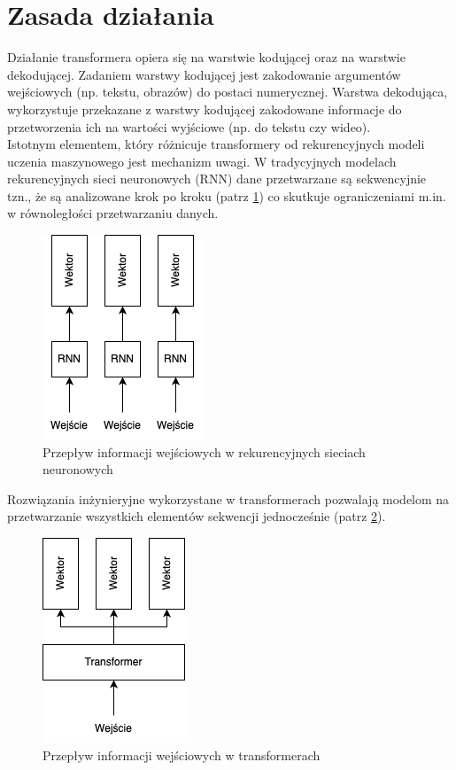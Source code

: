 \documentclass[12pt,a4paper,twoside]{book} %
\begin{document}
\section{Zasada działania}
Działanie transformera opiera się na warstwie kodującej oraz na warstwie dekodującej.
Zadaniem warstwy kodującej jest zakodowanie argumentów wejściowych (np. tekstu, obrazów) do postaci numerycznej. Warstwa dekodująca, wykorzystuje przekazane z warstwy kodującej zakodowane informacje do przetworzenia ich na wartości wyjściowe (np. do tekstu czy wideo). \\
Istotnym elementem, który różnicuje transformery od rekurencyjnych modeli uczenia maszynowego jest mechanizm uwagi. W tradycyjnych modelach rekurencyjnych sieci neuronowych (RNN) dane przetwarzane są sekwencyjnie tzn., że są analizowane krok po kroku (patrz \ref{fig:rnn_schema}) \cite{mamczur2020} co skutkuje ograniczeniami m.in. w równoległości przetwarzaniu danych.

\begin{figure}[h]
    \centering
	\includegraphics[scale=0.75]{figs/rnn.png}
	\caption{Przepływ informacji wejściowych w rekurencyjnych sieciach neuronowych}
	\label{fig:rnn_schema}
\end{figure}

\pagebreak

Rozwiązania inżynieryjne wykorzystane w transformerach pozwalają modelom na przetwarzanie wszystkich elementów sekwencji jednocześnie (patrz \ref{fig:transformer_schema}).

\begin{figure}[h]
    \centering
	\includegraphics[scale=0.75]{figs/transformer.png}
	\caption{Przepływ informacji wejściowych w transformerach}
	\label{fig:transformer_schema}
\end{figure}
\end{document}

